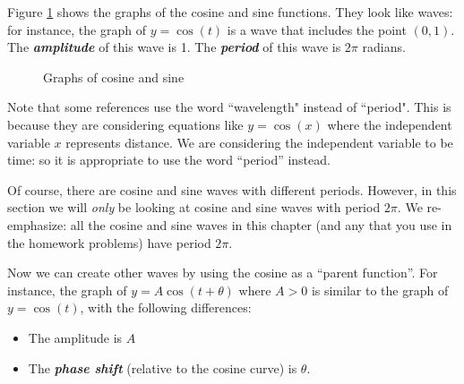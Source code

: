 Figure \ref{fig:complex:1} shows the graphs of the cosine and sine functions.  They look like waves: for instance, the graph of $y = \cos(t)$ is a wave that includes the point $(0,1)$. The {\bf \emph{amplitude}} of this wave is 1. The {\bf \emph{period}} of this wave is $2\pi$ radians. 

\begin{figure}[htb]
	  \caption{\label{fig:complex:1} Graphs of cosine and sine }
\end{figure}


Note that some references use the word ``wavelength" instead of ``period". This is because they are considering equations like $y = \cos(x)$ where the independent variable $x$ represents distance. We are considering the independent variable to be time: so it is appropriate to use the word ``period'' instead.

Of course, there are cosine and sine waves with different periods. However, in this section  we will \emph{only}  be looking at cosine and sine waves with period $2\pi$. We re-emphasize:  all the cosine and sine waves in this chapter (and any that you use in the homework problems) have period $2 \pi$.

Now we can create other waves by using the cosine as a ``parent function''. For instance, the graph of
$y = A  \cos ( t + \theta) $ where $A > 0$
is similar to the graph of $y = \cos(t)$, with the following differences:

\begin{itemize}
\item
The amplitude is $A$
\item
The \textbf{\emph{phase shift}} (relative to the cosine curve) is $\theta$. 
\end{itemize}

